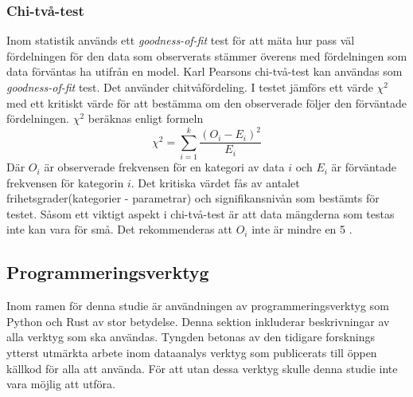 \documentclass[swedish,a4paper]{article}
\begin{document}
\subsubsection{Chi-två-test}
\label{sec:chi_square}
Inom statistik används ett \textit{goodness-of-fit} test för att mäta
hur pass väl fördelningen för den data som observerats stämmer överens
med fördelningen som data förväntas ha utifrån en model. Karl Pearsons
chi-två-test kan användas som \textit{goodness-of-fit} test. Det
använder chitvåfördeling. I testet jämförs ett värde $\chi^2$ med ett
kritiskt värde för att bestämma om den observerade följer den förväntade
fördelningen. $\chi^2$ beräknas enligt formeln
$$\chi^2 = \sum_{i=1}^k\frac{(O_i - E_i)^2}{E_i}$$
Där $O_i$ är observerade frekvensen för en kategori av data $i$ och $E_i$
är förväntade frekvensen för kategorin $i$.
Det kritiska värdet fås av antalet frihetsgrader(kategorier - parametrar)
och signifikansnivån som bestämts för testet. Såsom ett viktigt aspekt i chi-två-test är att data mängderna som testas inte kan vara för
små. Det rekommenderas att $O_i$ inte är mindre en 5 \parencite{nist}.



\subsection{Programmeringsverktyg}
\label{sec:verktyg}
Inom ramen för denna studie är användningen av programmeringsverktyg som Python
och Rust av stor betydelse. Denna sektion inkluderar beskrivningar av alla
verktyg som ska användas. Tyngden betonas av den tidigare forsknings ytterst
utmärkta arbete inom dataanalys verktyg som publicerats till öppen källkod för alla att
använda. För att utan dessa verktyg skulle denna studie inte
vara möjlig att utföra. 
\end{document}
